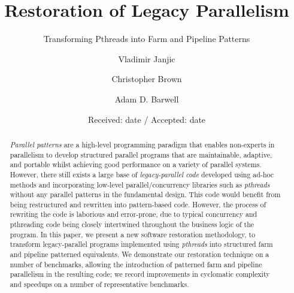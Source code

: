 \documentclass[smallextended]{svjour3}
\begin{document}
\title{Restoration of Legacy Parallelism}
\subtitle{Transforming Pthreads into Farm and Pipeline Patterns}
%
%
\author{Vladimir Janjic         \and
	Christopher Brown \and 
	Adam D. Barwell
}



\date{Received: date / Accepted: date}

\maketitle
%
\begin{abstract}
    \emph{Parallel patterns} are a high-level programming paradigm that enables non-experts in parallelism to develop structured parallel programs that are maintainable, adaptive, and portable whilst achieving good performance on a variety of parallel systems. However, there still exists a large base of \emph{legacy-parallel code} developed using ad-hoc methods and incorporating low-level parallel/concurrency libraries such as \emph{pthreads} without any parallel patterns in the fundamental design. This code would benefit from being restructured and rewritten into pattern-based code. However, the process of rewriting the code is laborious and error-prone, due to typical concurrency and pthreading code being closely intertwined throughout the business logic of the program. In this paper, we present a new software restoration methodology, to transform legacy-parallel programs implemented using \emph{pthreads} into structured farm and pipeline patterned equivalents. We demonstrate our restoration technique on a number of benchmarks, allowing the introduction of patterned farm and pipeline parallelism in the resulting code; we record improvements in cyclomatic complexity and speedups on a number of representative benchmarks.

\end{abstract}
\end{document}
